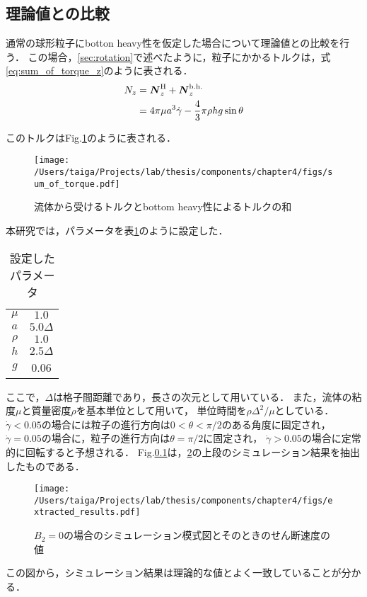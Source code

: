 \subsection{理論値との比較}
通常の球形粒子にbotton heavy性を仮定した場合について理論値との比較を行う．
この場合，\ref{sec:rotation}で述べたように，粒子にかかるトルクは，式\eqref{eq:sum_of_torque_z}のように表される．
    \begin{align}
        N_z &= \boldsymbol{N}^\mathrm{H}_z + \boldsymbol{N}^\mathrm{b.h.}_z \notag \\
            &= 4 \pi \mu a^3 \dot{\gamma} - \frac{4}{3} \pi \rho h g \sin \theta
    \end{align}

\noindent
このトルクはFig.\ref{fig:sum_of_torque}のように表される．

    \begin{figure}[H]
        \centering
        \texttt{[image: /Users/taiga/Projects/lab/thesis/components/chapter4/figs/sum\_of\_torque.pdf]}
        \caption{流体から受けるトルクとbottom heavy性によるトルクの和}
        \label{fig:sum_of_torque}
    \end{figure}

\noindent
本研究では，パラメータを表\ref{tab:parameters}のように設定した．

    \begin{table}[H]
        \centering
        \caption{設定したパラメータ}
        \label{tab:parameters}
        \begin{tabular}{cc}
            \hline
            $\mu$ & $1.0$ \\
            $a$ & $5.0 \Delta$ \\
            $\rho$ & $1.0$ \\
            $h$ & $2.5\Delta$ \\
            $g$ & 0.06 \\
            \hline
        \end{tabular}
    \end{table}

ここで，$\Delta$は格子間距離であり，長さの次元として用いている．
また，流体の粘度$\mu$と質量密度$\rho$を基本単位として用いて，
単位時間を$\rho \Delta ^2 / \mu$としている．
$\dot{\gamma} < 0.05$の場合には粒子の進行方向は$0 < \theta < \pi / 2$のある角度に固定され，
$\dot{\gamma} = 0.05$の場合に，粒子の進行方向は$\theta = \pi /2$に固定され，
$\dot{\gamma} > 0.05$の場合に定常的に回転すると予想される．
Fig.\ref{}は，\ref{fig:simulation_results}の上段のシミュレーション結果を抽出したものである．

    \begin{figure}[htbp]
        \centering
        \texttt{[image: /Users/taiga/Projects/lab/thesis/components/chapter4/figs/extracted\_results.pdf]}
        \caption{$B_2=0$の場合のシミュレーション模式図とそのときのせん断速度の値}
        \label{fig:simulation_results}
    \end{figure}

\noindent
この図から，シミュレーション結果は理論的な値とよく一致していることが分かる．
